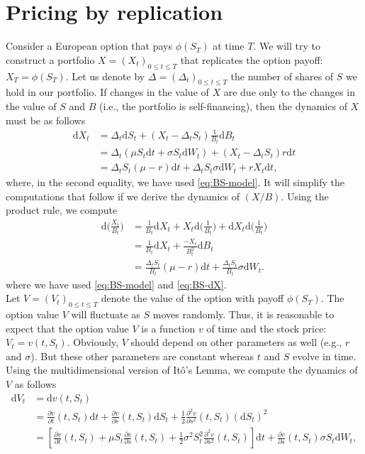 \documentclass[12pt]{book}
\numberwithin{equation}{chapter}
\theoremstyle{plain}
\numberwithin{theorem}{section}
\theoremstyle{definition}
\numberwithin{exercise}{chapter}
\newcommand{\<}{\langle}
\renewcommand{\>}{\rangle}
\renewcommand{\(}{\left(}
\renewcommand{\)}{\right)}
\renewcommand{\[}{\left[}
\renewcommand{\]}{\right]}
\newcommand\sig{\sigma}
\newcommand\Del{\Delta}
\renewcommand\d{\partial}
\newcommand\dd{\mathrm{d}}
\theoremstyle{definition}
\numberwithin{question}{section}
\begin{document}
\section{Pricing by replication}
Consider a European option that pays $\phi(S_T)$ at time $T$.  We will try to construct a portfolio $X = (X_t)_{0 \leq t \leq T}$ that replicates the option payoff: $X_T = \phi(S_T)$.  Let us denote by $\Del = (\Del_t)_{ 0 \leq t \leq T}$ the number of shares of $S$ we hold in our portfolio.  If changes in the value of $X$ are due only to the changes in the value of $S$ and $B$ (i.e., the portfolio is self-financing), then the dynamics of $X$ must be as follows
\begin{align}
\dd X_t 
	&=	\Del_t \dd S_t + (X_t - \Del_t S_t) \frac{1}{B_t} \dd B_t \\
	&=	\Del_t ( \mu S_t \dd t + \sig S_t \dd W_t ) + (X_t - \Del_t S_t) r \dd t \\
	&=	\Del_t S_t (\mu - r) \dd t + \Del_t S_t \sig \dd W_t + r X_t \dd t , \label{eq:BS-dX}
\end{align}
where, in the second equality, we have used \eqref{eq:BS-model}.  It will simplify the computations that follow if we derive the dynamics of $(X/B)$.  Using the product rule, we compute
\begin{align}
\dd \Big( \frac{X_t}{B_t} \Big)
	&=	\frac{1}{B_t} \dd X_t + X_t \dd \big( \frac{1}{B_t} \Big) + \dd X_t \dd \big( \frac{1}{B_t} \Big) \\
	&=	\frac{1}{B_t} \dd X_t + \frac{-X_t}{B_t^2} \dd B_t \\
	&=	\frac{\Del_t S_t}{B_t} (\mu - r) \dd t +  \frac{\Del_t S_t}{B_t}  \sig \dd W_t . \label{eq:XoverB}
\end{align}
where  we have used \eqref{eq:BS-model} and \eqref{eq:BS-dX}.
\\[0.5em]
Let $V = (V_t)_{0 \leq t \leq T}$ denote the value of the option with payoff $\phi(S_T)$.
The option value $V$ will fluctuate as $S$ moves randomly. Thus, it is reasonable to expect that the option value $V$ is a function $v$ of time and the stock price: $V_t = v(t, S_t)$.  Obviously, $V$ should depend on other parameters as well (e.g., $r$ and $\sig$).  But these other parameters are constant whereas $t$ and $S$ evolve in time. Using the multidimensional version of It\^o's Lemma, we compute the dynamics of $V$ as follows
\begin{align}
\dd V_t 
	&= \dd v(t,S_t) \\
	&=	\frac{\d v}{\d t}(t,S_t) \dd t + \frac{\d v}{\d s}(t,S_t) \dd S_t + \frac{1}{2} \frac{\d^2 v}{\d s^2}(t,S_t) ( \dd S_t )^2 \\
	&= \[ \frac{\d v}{\d t}(t,S_t) + \mu S_t \frac{\d v}{\d s}(t,S_t) + \frac{1}{2} \sigma^2 S_t^2 \frac{\d^2 v}{\d s^2}(t,S_t) \] \dd t 
			+ \frac{\d v}{\d s} (t,S_t) \sigma S_t \dd W_t , \label{eq:BS-dV}
\end{align}
\end{document}
